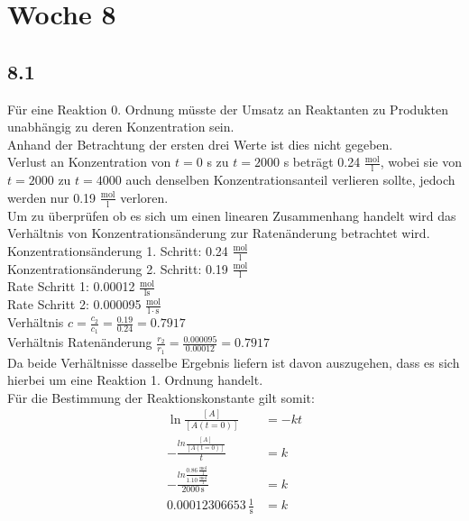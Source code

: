 \documentclass{article}
\begin{document}
\section*{Woche 8}
\subsection*{8.1}
Für eine Reaktion 0. Ordnung müsste der Umsatz an Reaktanten zu Produkten unabhängig zu deren Konzentration sein.\\
Anhand der Betrachtung der ersten drei Werte ist dies nicht gegeben.\\
Verlust an Konzentration von $t = 0$ s zu $t = 2000$ s beträgt 0.24 $\mathrm{\frac{mol}{l}}$, wobei sie von $t = 2000$ zu $t = 4000$ auch denselben Konzentrationsanteil verlieren sollte, jedoch werden nur 0.19 $\mathrm{\frac{mol}{l}}$ verloren.\\
Um zu überprüfen ob es sich um einen linearen Zusammenhang handelt wird das Verhältnis von Konzentrationsänderung zur Ratenänderung betrachtet wird.\\
Konzentrationsänderung 1. Schritt: 0.24 $\mathrm{\frac{mol}{l}}$\\
Konzentrationsänderung 2. Schritt: 0.19 $\mathrm{\frac{mol}{l}}$\\
Rate Schritt 1: 0.00012 $\mathrm{\frac{mol}{l \dot s}}$\\
Rate Schritt 2: 0.000095 $\mathrm{\frac{mol}{l \cdot s}}$\\
Verhältnis $c = \frac{c_2}{c_1} = \frac{0.19}{0.24} = 0.7917$\\
Verhältnis Ratenänderung $\frac{r_2}{r_1} = \frac{0.000095}{0.00012} = 0.7917$\\
Da beide Verhältnisse dasselbe Ergebnis liefern ist davon auszugehen, dass es sich hierbei um eine Reaktion 1. Ordnung handelt.\\
Für die Bestimmung der Reaktionskonstante gilt somit:\\
\begin{align*}
    \ln \frac{[A]}{[A(t=0)]} &= -kt\\
    - \frac{ln \frac{[A]}{[A(t=0)]}}{t} &= k\\
    - \frac{ln \frac{0.86\,\mathrm{\frac{mol}{l}}}{1.10\,\mathrm{\frac{mol}{l}}}}{2000\,\mathrm{s}} &= k\\
    0.00012306653\,\mathrm{\frac{1}{s}} &= k
\end{align*}
\end{document}
